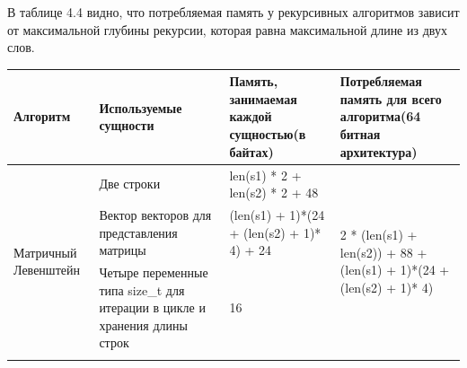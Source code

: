 \documentclass[12pt,a4paper,oneside]{report}
\begin{document}
\qquad В таблице 4.4 видно, что потребляемая память у рекурсивных алгоритмов зависит от максимальной глубины рекурсии, которая равна максимальной длине из двух слов. 
\begin{longtable}[H]{|p{3cm}|p{3cm}|p{5cm}|p{5cm}|}
	\hline
 Алгоритм & Используемые сущности                                      & Память, занимаемая каждой сущностью(в байтах) & Потребляемая память для всего алгоритма(64 битная архитектура)                          \\
	\hline
	\multirow{4}{3cm}{Матричный Левенштейн}                                                                                                                                                                    & Две строки                                 & len(s1) * 2 + len(s2) * 2   + 48                & \multirow{4}{5cm}{2 * (len(s1) + len(s2)) + 88 + (len(s1) + 1)*(24 + (len(s2) + 1)* 4)}  \\ 
	\cline{2-3}
	& Вектор векторов для представления матрицы&  (len(s1) + 1)*(24 + (len(s2) + 1)* 4)              + 24                             &                                                                                         \\ 
	\cline{2-3}
	& Четыре переменные типа size\_t для итерации в цикле и хранения длины строк               & 16                                            &                                                                                         \\ 
	\cline{2-3}


\end{longtable}
\end{document}
